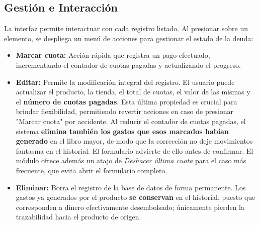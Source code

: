 \subsection{Gestión e Interacción}
La interfaz permite interactuar con cada registro listado. Al presionar sobre un elemento, se despliega un menú de acciones para gestionar el estado de la deuda:
\begin{itemize}
    \item \textbf{Marcar cuota:} Acción rápida que registra un pago efectuado, incrementando el contador de cuotas pagadas y actualizando el progreso.
    \item \textbf{Editar:} Permite la modificación integral del registro. El usuario puede actualizar el producto, la tienda, el total de cuotas, el valor de las mismas y el \textbf{número de cuotas pagadas}. Esta última propiedad es crucial para brindar flexibilidad, permitiendo revertir acciones en caso de presionar "Marcar cuota" por accidente.
    Al reducir el contador de cuotas pagadas, el sistema \textbf{elimina también los gastos que esos marcados habían generado} en el libro mayor, de modo que la corrección no deje movimientos fantasma en el historial. El formulario advierte de ello antes de confirmar. El módulo ofrece además un atajo de \textit{Deshacer última cuota} para el caso más frecuente, que evita abrir el formulario completo.
    \item \textbf{Eliminar:} Borra el registro de la base de datos de forma permanente. Los gastos ya generados por el producto \textbf{se conservan} en el historial, puesto que corresponden a dinero efectivamente desembolsado; únicamente pierden la trazabilidad hacia el producto de origen.
\end{itemize}